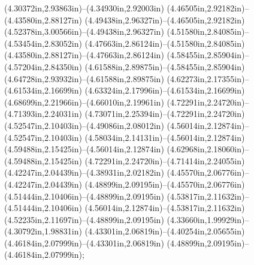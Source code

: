 (4.30372in,2.93863in)--(4.34930in,2.92003in) (4.46505in,2.92182in)--(4.43580in,2.88127in) (4.49438in,2.96327in)--(4.46505in,2.92182in) (4.52378in,3.00566in)--(4.49438in,2.96327in) (4.51580in,2.84085in)--(4.53454in,2.83052in) (4.47663in,2.86124in)--(4.51580in,2.84085in) (4.43580in,2.88127in)--(4.47663in,2.86124in) (4.58455in,2.85904in)--(4.57204in,2.84350in) (4.61588in,2.89875in)--(4.58455in,2.85904in) (4.64728in,2.93932in)--(4.61588in,2.89875in) (4.62273in,2.17355in)--(4.61534in,2.16699in) (4.63324in,2.17996in)--(4.61534in,2.16699in) (4.68699in,2.21966in)--(4.66010in,2.19961in) (4.72291in,2.24720in)--(4.71393in,2.24031in) (4.73071in,2.25394in)--(4.72291in,2.24720in) (4.52547in,2.10403in)--(4.49086in,2.08012in) (4.56014in,2.12874in)--(4.52547in,2.10403in) (4.58034in,2.14131in)--(4.56014in,2.12874in) (4.59488in,2.15425in)--(4.56014in,2.12874in) (4.62968in,2.18060in)--(4.59488in,2.15425in) (4.72291in,2.24720in)--(4.71414in,2.24055in) (4.42247in,2.04439in)--(4.38931in,2.02182in) (4.45570in,2.06776in)--(4.42247in,2.04439in) (4.48899in,2.09195in)--(4.45570in,2.06776in) (4.51444in,2.10406in)--(4.48899in,2.09195in) (4.53817in,2.11632in)--(4.51444in,2.10406in) (4.56014in,2.12874in)--(4.53817in,2.11632in) (4.52235in,2.11697in)--(4.48899in,2.09195in) (4.33660in,1.99929in)--(4.30792in,1.98831in) (4.43301in,2.06819in)--(4.40254in,2.05655in) (4.46184in,2.07999in)--(4.43301in,2.06819in) (4.48899in,2.09195in)--(4.46184in,2.07999in);
